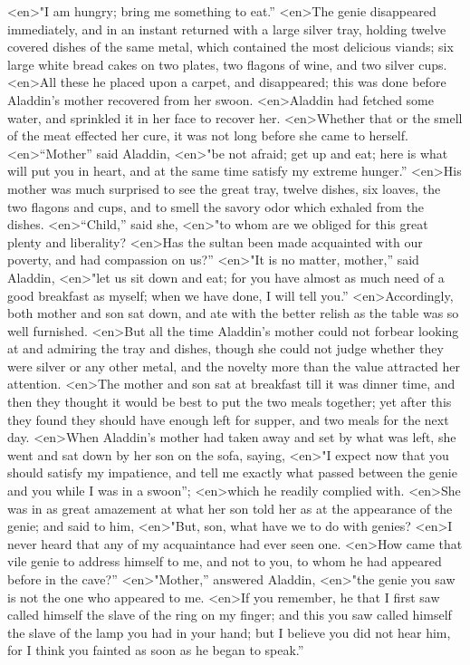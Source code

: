 <en>"I am hungry; bring me something to eat.”
<en>The genie disappeared immediately, and in an instant returned with a large silver tray, holding twelve covered dishes of the same metal, which contained the most delicious viands; six large white bread cakes on two plates, two flagons of wine, and two silver cups.
<en>All these he placed upon a carpet, and disappeared; this was done before Aladdin’s mother recovered from her swoon.
<en>Aladdin had fetched some water, and sprinkled it in her face to recover her.
<en>Whether that or the smell of the meat effected her cure, it was not long before she came to herself.
<en>“Mother” said Aladdin,
<en>"be not afraid; get up and eat; here is what will put you in heart, and at the same time satisfy my extreme hunger.”
<en>His mother was much surprised to see the great tray, twelve dishes, six loaves, the two flagons and cups, and to smell the savory odor which exhaled from the dishes.
<en>“Child,” said she,
<en>"to whom are we obliged for this great plenty and liberality?
<en>Has the sultan been made acquainted with our poverty, and had compassion on us?”
<en>"It is no matter, mother,” said Aladdin,
<en>"let us sit down and eat; for you have almost as much need of a good breakfast as myself; when we have done, I will tell you.”
<en>Accordingly, both mother and son sat down, and ate with the better relish as the table was so well furnished.
<en>But all the time Aladdin’s mother could not forbear looking at and admiring the tray and dishes, though she could not judge whether they were silver or any other metal, and the novelty more than the value attracted her attention.
<en>The mother and son sat at breakfast till it was dinner time, and then they thought it would be best to put the two meals together; yet after this they found they should have enough left for supper, and two meals for the next day.
<en>When Aladdin’s mother had taken away and set by what was left, she went and sat down by her son on the sofa, saying,
<en>"I expect now that you should satisfy my impatience, and tell me exactly what passed between the genie and you while I was in a swoon”;
<en>which he readily complied with.
<en>She was in as great amazement at what her son told her as at the appearance of the genie; and said to him,
<en>"But, son, what have we to do with genies?
<en>I never heard that any of my acquaintance had ever seen one.
<en>How came that vile genie to address himself to me, and not to you, to whom he had appeared before in the cave?”
<en>"Mother,” answered Aladdin,
<en>"the genie you saw is not the one who appeared to me.
<en>If you remember, he that I first saw called himself the slave of the ring on my finger; and this you saw called himself the slave of the lamp you had in your hand; but I believe you did not hear him, for I think you fainted as soon as he began to speak.”
